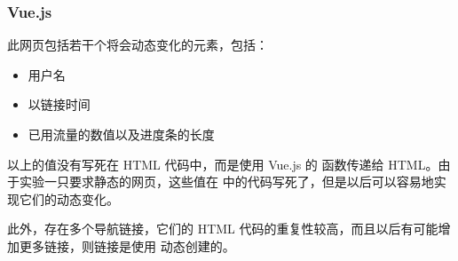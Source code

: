 \subsubsection{Vue.js}

此网页包括若干个将会动态变化的元素，包括：

\begin{itemize}
  \item 用户名
  \item 以链接时间
  \item 已用流量的数值以及进度条的长度
\end{itemize}

以上的值没有写死在 HTML 代码中，而是使用 Vue.js 的  函数传递给 HTML。由于实验一只要求静态的网页，这些值在  中的代码写死了，但是以后可以容易地实现它们的动态变化。

此外，存在多个导航链接，它们的 HTML 代码的重复性较高，而且以后有可能增加更多链接，则链接是使用  动态创建的。